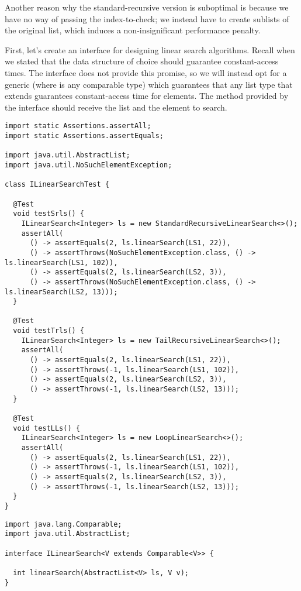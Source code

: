 Another reason why the standard-recursive version is suboptimal is because we have no way of passing the index-to-check; we instead have to create sublists of the original list, which induces a non-insignificant performance penalty.

First, let's create an interface for designing linear search algorithms. 
Recall when we stated that the data structure of choice should guarantee constant-access times. 
The  interface does not provide this promise, so we will instead opt for a generic  (where  is any comparable type) which guarantees that any list type that extends  guarantees constant-access time for elements. 
The method provided by the interface should receive the list and the element to search.

\enlargethispage{-1\baselineskip}
\begin{lstlisting}[language=MyJava]
import static Assertions.assertAll;
import static Assertions.assertEquals;

import java.util.AbstractList;
import java.util.NoSuchElementException;

class ILinearSearchTest {

  @Test
  void testSrls() {
    ILinearSearch<Integer> ls = new StandardRecursiveLinearSearch<>();
    assertAll(
      () -> assertEquals(2, ls.linearSearch(LS1, 22)),
      () -> assertThrows(NoSuchElementException.class, () -> ls.linearSearch(LS1, 102)),
      () -> assertEquals(2, ls.linearSearch(LS2, 3)),
      () -> assertThrows(NoSuchElementException.class, () -> ls.linearSearch(LS2, 13)));
  }

  @Test
  void testTrls() {
    ILinearSearch<Integer> ls = new TailRecursiveLinearSearch<>();
    assertAll(
      () -> assertEquals(2, ls.linearSearch(LS1, 22)),
      () -> assertThrows(-1, ls.linearSearch(LS1, 102)),
      () -> assertEquals(2, ls.linearSearch(LS2, 3)),
      () -> assertThrows(-1, ls.linearSearch(LS2, 13)));
  }

  @Test
  void testLLs() {
    ILinearSearch<Integer> ls = new LoopLinearSearch<>();
    assertAll(
      () -> assertEquals(2, ls.linearSearch(LS1, 22)),
      () -> assertThrows(-1, ls.linearSearch(LS1, 102)),
      () -> assertEquals(2, ls.linearSearch(LS2, 3)),
      () -> assertThrows(-1, ls.linearSearch(LS2, 13)));
  }
}
\end{lstlisting}

\begin{lstlisting}[language=MyJava]
import java.lang.Comparable;
import java.util.AbstractList;

interface ILinearSearch<V extends Comparable<V>> {
  
  int linearSearch(AbstractList<V> ls, V v);
}
\end{lstlisting}

